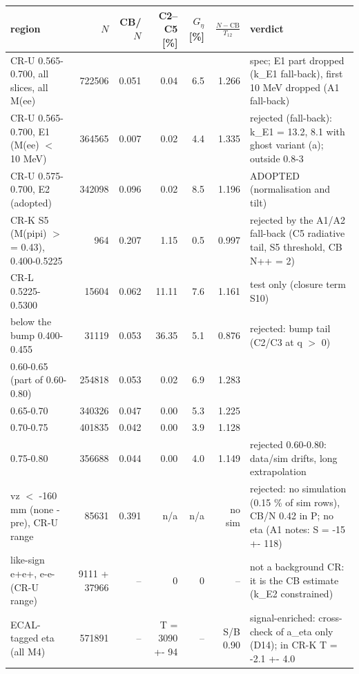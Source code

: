 \begin{tabular}{p{5.2cm}rrrrrp{5.6cm}}
\toprule
region & $N$ & CB/$N$ & C2--C5 [\%] & $G_\eta$ [\%] & $\frac{N-\mathrm{CB}}{T_{12}}$ & verdict \\
\midrule
CR-U 0.565-0.700, all slices, all M(ee) & 722506 & 0.051 & 0.04 & 6.5 & 1.266 & spec; E1 part dropped (k\_E1 fall-back), first 10 MeV dropped (A1 fall-back) \\
CR-U 0.565-0.700, E1 (M(ee) $<$ 10 MeV) & 364565 & 0.007 & 0.02 & 4.4 & 1.335 & rejected (fall-back): k\_E1 = 13.2, 8.1 with ghost variant (a); outside 0.8-3 \\
CR-U 0.575-0.700, E2 (adopted) & 342098 & 0.096 & 0.02 & 8.5 & 1.196 & ADOPTED (normalisation and tilt) \\
CR-K S5 (M(pipi) $>$= 0.43), 0.400-0.5225 & 964 & 0.207 & 1.15 & 0.5 & 0.997 & rejected by the A1/A2 fall-back (C5 radiative tail, S5 threshold, CB N++ = 2) \\
CR-L 0.5225-0.5300 & 15604 & 0.062 & 11.11 & 7.6 & 1.161 & test only (closure term S10) \\
below the bump 0.400-0.455 & 31119 & 0.053 & 36.35 & 5.1 & 0.876 & rejected: bump tail (C2/C3 at q $>$ 0) \\
0.60-0.65 (part of 0.60-0.80) & 254818 & 0.053 & 0.02 & 6.9 & 1.283 &  \\
0.65-0.70 & 340326 & 0.047 & 0.00 & 5.3 & 1.225 &  \\
0.70-0.75 & 401835 & 0.042 & 0.00 & 3.9 & 1.128 &  \\
0.75-0.80 & 356688 & 0.044 & 0.00 & 4.0 & 1.149 & rejected 0.60-0.80: data/sim drifts, long extrapolation \\
vz $<$ -160 mm (none - pre), CR-U range & 85631 & 0.391 & n/a & n/a & no sim & rejected: no simulation (0.15 \% of sim rows), CB/N 0.42 in P; no eta (A1 notes: S = -15 +- 118) \\
like-sign e+e+, e-e- (CR-U range) & 9111 + 37966 & -- & 0 & 0 & -- & not a background CR: it is the CB estimate (k\_E2 constrained) \\
ECAL-tagged eta (all M4) & 571891 & -- & T = 3090 +- 94 & -- & S/B 0.90 & signal-enriched: cross-check of a\_eta only (D14); in CR-K T = -2.1 +- 4.0 \\
\bottomrule
\end{tabular}
